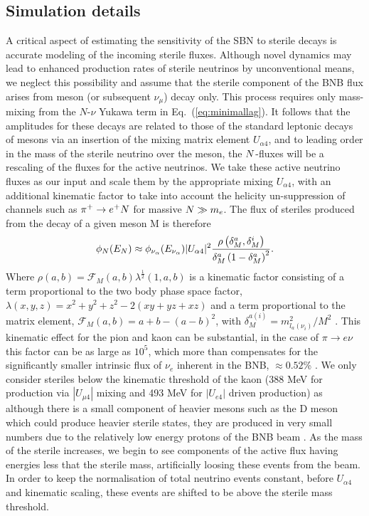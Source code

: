 \documentclass[11pt, a4paper]{article}
\newcommand{\refeq}[1]{Eq.~(\ref{#1})}
\def\ster{\ensuremath N}
\begin{document}
\subsection{Simulation details}
A critical aspect of estimating the sensitivity of the SBN to sterile decays is
accurate modeling of the incoming sterile fluxes. 
%
Although novel dynamics may lead to enhanced production rates of sterile
neutrinos by unconventional means, we neglect this possibility and assume that
the sterile component of the BNB flux arises from meson (or subsequent $\nu_\mu$) decay only. This process
requires only mass-mixing from the $N$-$\nu$ Yukawa term in
\refeq{eq:minimallag}. It follows that the amplitudes for these decays are
related to those of the standard leptonic decays of mesons via an insertion of
the mixing matrix element $U_{\alpha 4}$, and to leading order in the mass of
the sterile neutrino over the meson, the $\ster$-fluxes will be a rescaling of
the fluxes for the active neutrinos. We take these active neutrino fluxes as our
input and scale them by the appropriate mixing $U_{\alpha 4}$, with an
additional kinematic factor to take into account the helicity un-suppression of
channels such as $\pi^+ \rightarrow e^+\ster$ for massive $\ster \gg m_e$. The
flux of steriles produced from the decay of a given meson M is therefore
%
\[ \phi_{\ster}(E_{\ster}) \approx \phi_{\nu_\alpha} (E_{\nu_\alpha})\vert
U_{\alpha 4}\vert^2 \frac{\rho\left( \delta_M^a , \delta_M^i
\right)}{\delta_M^a \left(1- \delta_M^a\right)^2}.  \]
%
Where $\rho(a,b)=\mathcal{F}_M(a,b) \lambda^{\frac{1}{2}}(1,a,b)$ is a
kinematic factor consisting of a term proportional to the two body phase space
factor, $\lambda(x,y,z)=x^2+y^2+z^2-2(x y+yz+x z)$ and a term proportional to
the matrix element, $\mathcal{F}_M(a,b)= a+b -\left(a-b\right)^2$, with
$\delta_M^{a(i)}=m_{l_a(\nu_i)}^2/M^2$ \cite{PhysRevD.24.1232}. This kinematic
effect for the pion and kaon can be substantial, in the case of $\pi
\rightarrow e \nu$ this factor can be as large as $10^5$, which more than compensates
for the significantly smaller intrinsic flux of $\nu_e$  inherent in the BNB, $\approx 0.52$\% \cite{AguilarArevalo:2008yp}. We only
consider steriles below the kinematic threshold of the kaon (388 MeV for
production via $|U_{\mu4}|$ mixing and 493 MeV for $|U_{e4}|$ driven
production) as although there is a small component of heavier mesons such as
the D meson which could produce heavier sterile states, they are produced in
very small numbers due to the relatively low energy protons of the BNB beam \cite{AguilarArevalo:2008yp}. As
the mass of the sterile increases, we begin to see components of the active flux
having energies less that the sterile mass, artificially loosing these events
from the beam. In order to keep the normalisation of total neutrino events
constant, before $U_{\alpha 4}$ and kinematic scaling, these events are shifted
to be above the sterile mass threshold.
\end{document}
